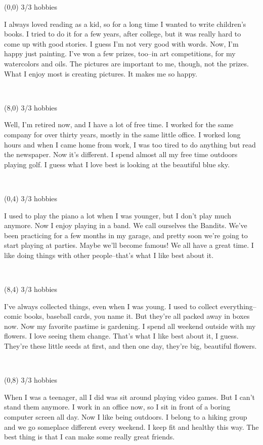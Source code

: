 \documentclass[a4paper]{article}
\newcommand{\mycard}[5]{%
	\vspace{0.1cm}
	\small #1 #2
	\par
	\parbox[t][6.7cm][c]{9.5cm}{%
	\hspace{0.1cm} \large#3 \\
	\normalsize#4 #5
	}
}
\begin{document}
\begin{textblock}{8}(0,0)
\mycard{3/3}{hobbies}{\parbox{9.0cm}{
I always loved reading as a kid, so for a long time I wanted to write children's books. I tried to do it for a few years, after college, but it was really hard to come up with good stories. I guess I'm not very good with words. Now, I'm happy just painting. I've won a few prizes, too--in art competitions, for my watercolors and oils. The pictures are important to me, though, not the prizes. What I enjoy most is creating pictures. It makes me so happy.
}}{}{} 
\end{textblock}

\begin{textblock}{8}(8,0)
\mycard{3/3}{hobbies}{\parbox{9.0cm}{
Well, I'm retired now, and I have a lot of free time. I worked for the same company for over thirty years, mostly in the same little office. I worked long hours and when I came home from work, I was too tired to do anything but read the newspaper. Now it's different. I spend almost all my free time outdoors playing golf. I guess what I love best is looking at the beautiful blue sky.
}}{}{} 
\end{textblock}

\begin{textblock}{8}(0,4)
\mycard{3/3}{hobbies}{\parbox{9.0cm}{
I used to play the piano a lot when I was younger, but I don't play much anymore. Now I enjoy playing in a band. We call ourselves the Bandits. We've been practicing for a few months in my garage, and pretty soon we're going to start playing at parties. Maybe we'll become famous! We all have a great time. I like doing things with other people--that's what I like best about it.
}}{}{} 
\end{textblock}

\begin{textblock}{8}(8,4)
\mycard{3/3}{hobbies}{\parbox{9.0cm}{
I've always collected things, even when I was young. I used to collect everything--comic books, baseball cards, you name it. But they're all packed away in boxes now. Now my favorite pastime is gardening. I spend all weekend outside with my flowers. I love seeing them change. That's what I like best about it, I guess. They're these little seeds at first, and then one day, they're big, beautiful flowers.
}}{}{} 
\end{textblock}

\begin{textblock}{8}(0,8)
\mycard{3/3}{hobbies}{\parbox{9.0cm}{
When I was a teenager, all I did was sit around playing video games. But I can't stand them anymore. I work in an office now, so I sit in front of a boring computer screen all day. Now I like being outdoors. I belong to a hiking group and we go someplace different every weekend. I keep fit and healthy this way. The best thing is that I can make some really great friends.
}}{}{} 
\end{textblock}
\end{document}
